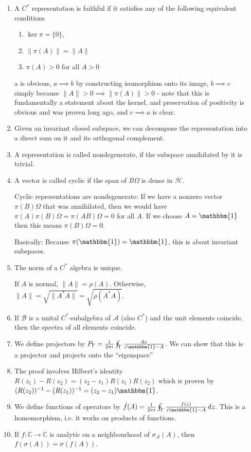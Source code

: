 \documentclass[twoside,symmetric, openany, 12pt]{./tuftebook}
\theoremstyle{definition}
\theoremstyle{definition}
\theoremstyle{definition}
\begin{document}
\begin{enumerate}
		Proof: It is clearly vector space isomorphic. Then, for any invertible $\pi$, we have $\|A\|=\|\pi^{-1}(\pi(A))\|\le \|\pi(A)\|\le A$ and hence $\pi$ is norm preserving.
	\item A $C^*$ representation is faithful if it satisfies any of the following equivalent conditions
		\begin{enumerate}
			\item $\ker \pi = \{0\} $,
			\item $\|\pi(A)\|=\|A\|$ 
			\item $\pi(A) > 0$ for all $A>0$
		\end{enumerate}
		a is obvious, $a\implies b$ by constructing isomorphism onto its image, $b\implies c$ simply because $\|A\|>0\implies \|\pi(A)\|>0$ - note that this is fundamentally a statement about the kernel, and preservation of positivity is obvious and was proven long ago, and $c\implies a$ is clear. 
	\item Given an invariant closed subspace, we can decompose the representation into a direct sum on it and its orthogonal complement.
	\item A representation is called nondegenerate, if the subspace annihilated by it is trivial.
	\item A vector is called cyclic if the span of $B\Omega$ is dense in $\mathcal{H}$.
	
		Cyclic representations are nondegenerate: If we have a nonzero vector $\pi(B)\Omega$ that was annihilated, then we would have $\pi(A)\pi(B)\Omega=\pi(AB)\Omega=0$ for all $A$. If we choose $A=\mathbbm{1}$ then this means $\pi(B)\Omega=0$.

		Basically: Because $\pi(\mathbbm{1})=\mathbbm{1}$, this is about invariant subspaces.
	\item The norm of a $C^*$ algebra is unique.

		If $A$ is normal, $\|A\|=\rho(A)$. Otherwise, $\|A\|=\sqrt{\|A^* A\|} =\sqrt{\rho(A^*A)} $.
	\item If $\mathcal{B}$ is a unital $C^*$-subalgebra of $\mathcal{A}$ (also $C^*$) and the unit elements coincide, then the spectra of all elements coincide.
	\item We define projectors by $P_\Gamma = \frac{1}{2\pi i}\oint_\Gamma \frac{\dd{z}}{z\mathbbm{1}-A}$. We can show that this is a projector and projects onto the ``eigenspace''
	\item The proof involves Hilbert's identity $R(z_1)-R(z_2)=(z_2-z_1)R(z_1)R(z_2)$ which is proven by $(R(z_2))^{-1}-(R(z_1))^{-1}=(z_2-z_1)\mathbbm{1}$.
	\item We define functions of operators by $\hat{f}(A) = \frac{1}{2\pi i}\oint_\Gamma \frac{f(z)}{z\mathbbm{1}-A}\dd{z}$. This is a homomorphism, i.e. it works on products of functions.
	\item If $f:\mathbb{C} \to \mathbb{C}$ is analytic on a neighbourhood of $\sigma_{\mathcal{A}}(A)$, then $f(\sigma(A))=\sigma(f(A))$. 


\end{enumerate}
\end{document}
